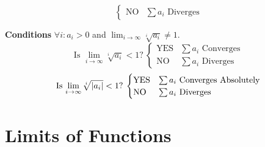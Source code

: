 \documentclass{article}
\theoremstyle{plain}
\numberwithin{theorem}{subsection}
\theoremstyle{definition}
\numberwithin{definition}{subsection}
\theoremstyle{remark}
\numberwithin{note}{subsection}
\begin{document}
\begin{multicols}{2}
\begin{mdframed}[style=exampledefaultcols,frametitle={Ratio Test}]
\begin{equation*}
\begin{cases}
				\text{NO} & \text{$\sum a_i$ Diverges}
			\end{cases}
		\end{equation*}
	\end{mdframed}
	\begin{mdframed}[style=exampledefaultcols,frametitle={Root Test}]
		\textbf{Conditions} $\forall i:a_i>0$ and $\displaystyle \lim_{i\to\infty}\sqrt[i]{a_i}\neq 1$.
		\begin{equation*}
			\text{Is $\lim_{i\to\infty}\sqrt[i]{a_i} < 1$?}\:
			\begin{cases}
				\text{YES} & \text{$\sum a_i$ Converges} \\
				\text{NO} & \text{$\sum a_i$ Diverges}
			\end{cases}
		\end{equation*}
		\begin{equation*}
			\text{Is $\lim_{i\to\infty}\sqrt[i]{\abs{a_i}} < 1$?}\:
			\begin{cases}
				\text{YES} & \text{$\sum a_i$ Converges Absolutely} \\
				\text{NO} & \text{$\sum a_i$ Diverges}
			\end{cases}
		\end{equation*}
	\end{mdframed}
\end{multicols}
\pagebreak
%
\section{Limits of Functions}
\end{document}
